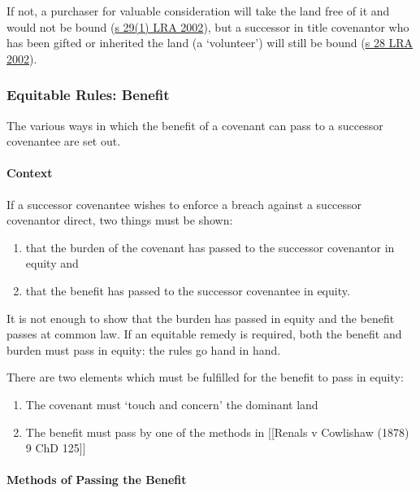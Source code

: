 \documentclass[
]{article}
\providecommand{\tightlist}{%
  \setlength{\itemsep}{0pt}\setlength{\parskip}{0pt}}
\begin{document}
If not, a purchaser for valuable consideration will take the land free
of it and would not be bound
(\href{https://www.legislation.gov.uk/ukpga/2002/9/section/29}{s 29(1)
LRA 2002}), but a successor in title covenantor who has been gifted or
inherited the land (a `volunteer') will still be bound
(\href{https://www.legislation.gov.uk/ukpga/2002/9/section/28}{s 28 LRA
2002}).

\hypertarget{equitable-rules-benefit}{%
\subsubsection{Equitable Rules: Benefit}\label{equitable-rules-benefit}}

The various ways in which the benefit of a covenant can pass to a
successor covenantee are set out.

\hypertarget{context-1}{%
\paragraph{Context}\label{context-1}}

If a successor covenantee wishes to enforce a breach against a successor
covenantor direct, two things must be shown:

\begin{enumerate}
\def\labelenumi{\arabic{enumi}.}
\tightlist
\item
  that the burden of the covenant has passed to the successor covenantor
  in equity and
\item
  that the benefit has passed to the successor covenantee in equity.
\end{enumerate}

It is not enough to show that the burden has passed in equity and the
benefit passes at common law. If an equitable remedy is required, both
the benefit and burden must pass in equity: the rules go hand in hand.

There are two elements which must be fulfilled for the benefit to pass
in equity:

\begin{enumerate}
\def\labelenumi{\arabic{enumi}.}
\tightlist
\item
  The covenant must `touch and concern' the dominant land
\item
  The benefit must pass by one of the methods in {[}{[}Renals v
  Cowlishaw (1878) 9 ChD 125{]}{]}
\end{enumerate}

\hypertarget{methods-of-passing-the-benefit}{%
\paragraph{Methods of Passing the
Benefit}\label{methods-of-passing-the-benefit}}
\end{document}
